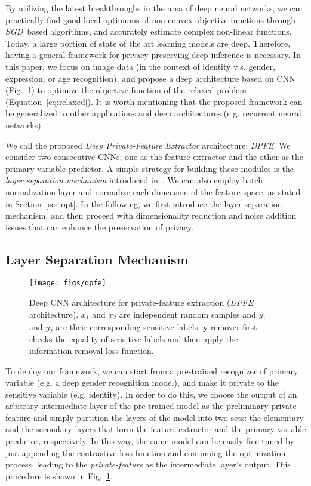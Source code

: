 \documentclass[10pt,journal,compsoc]{IEEEtran}
\begin{document}
By utilizing the latest breakthroughs in the area of deep neural networks, we can practically find good local optimums of non-convex objective functions through \emph{SGD}~based algorithms, and accurately estimate complex non-linear functions. Today, a large portion of state of the art learning models are deep. Therefore, having a general framework for privacy preserving deep inference is necessary. %
In this paper, we focus on image data (in the context of identity v.s. gender, expression, or age recognition), and propose a deep architecture based on CNN (Fig.~\ref{fig:arc}) to optimize the objective function of the relaxed problem (Equation~\ref{eq:relaxed}). It is worth mentioning that the proposed framework can be generalized to other applications and deep architectures (e.g. recurrent neural networks).

We call the proposed \emph{Deep Private-Feature Extractor} architecture; \emph{DPFE}. We consider two consecutive CNNs; one as the feature extractor and the other as the primary variable predictor. A simple strategy for building these modules is the \emph{layer separation mechanism} introduced in~\cite{osia2017_2}. We can also employ batch normalization layer \cite{ioffe2015} and normalize each dimension of the feature space, as stated in Section~\ref{sec:opt}. In the following, we first introduce the layer separation mechanism, and then proceed with dimensionality reduction and noise addition issues that can enhance the preservation of privacy.
 

\subsection{Layer Separation Mechanism}\begin{figure}[t]
	\centering
	\texttt{[image: figs/dpfe]} 
	\caption{Deep CNN architecture for private-feature extraction (\emph{DPFE} architecture). $x_1$ and $x_2$ are independent random samples and $y_1$ and $y_2$ are their corresponding sensitive labels. $\textbf{y}$-remover first checks the equality of sensitive labels and then apply the information removal loss function.}
	\label{fig:arc}
\end{figure}%
To deploy our framework, we can start from a pre-trained recognizer of primary variable (e.g. a deep gender recognition model), and make it private to the sensitive variable (e.g. identity). In order to do this, we choose the output of an arbitrary intermediate layer of the pre-trained model as the preliminary private-feature and simply partition the layers of the model into two sets: the elementary and the secondary layers that form the feature extractor and the primary variable predictor, respectively. In this way, the same model can be easily fine-tuned by just appending the contrastive loss function and continuing the optimization process, leading to the \emph{private-feature} as the intermediate layer's output. This procedure is shown in Fig.~\ref{fig:arc}.
\end{document}
